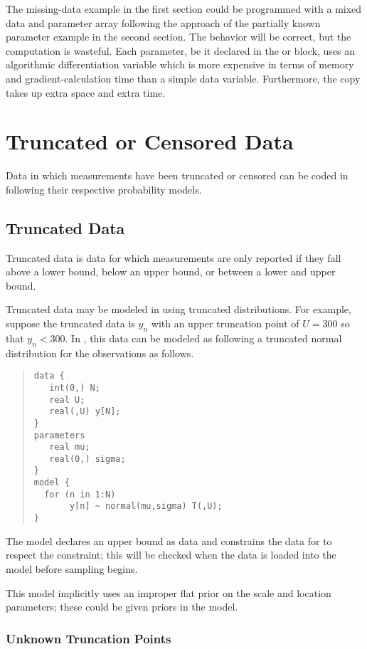 The missing-data example in the first section could be programmed with
a mixed data and parameter array following the approach of the
partially known parameter example in the second section.  The behavior
will be correct, but the computation is wasteful.  Each parameter, be
it declared in the  or 
block, uses an algorithmic differentiation variable which is more
expensive in terms of memory and gradient-calculation time than a
simple data variable.  Furthermore, the copy takes up extra space and
extra time.


\chapter{Truncated or Censored Data}

\noindent
Data in which measurements have been truncated or censored can be
coded in \Stan following their respective probability models.

\section{Truncated Data}

Truncated data is data for which measurements are only reported if
they fall above a lower bound, below an upper bound, or between a
lower and upper bound.  

Truncated data may be modeled in \Stan using truncated distributions.
For example, suppose the truncated data is $y_n$ with an upper
truncation point of $U = 300$ so that $y_n < 300$.  In \Stan, this
data can be modeled as following a truncated normal distribution for
the observations as follows. 
%
\begin{quote}
\begin{Verbatim} 
data {
   int(0,) N;
   real U;
   real(,U) y[N];
} 
parameters
   real mu;
   real(0,) sigma;
} 
model {
  for (n in 1:N)
       y[n] ~ normal(mu,sigma) T(,U);
}
\end{Verbatim}
\end{quote}
% 
The model declares an upper bound  as data and constrains
the data for  to respect the constraint;  this will be checked
when the data is loaded into the model before sampling begins.

This model implicitly uses an improper flat prior on the scale and
location parameters; these could be given priors in the model.

\subsection{Unknown Truncation Points}

